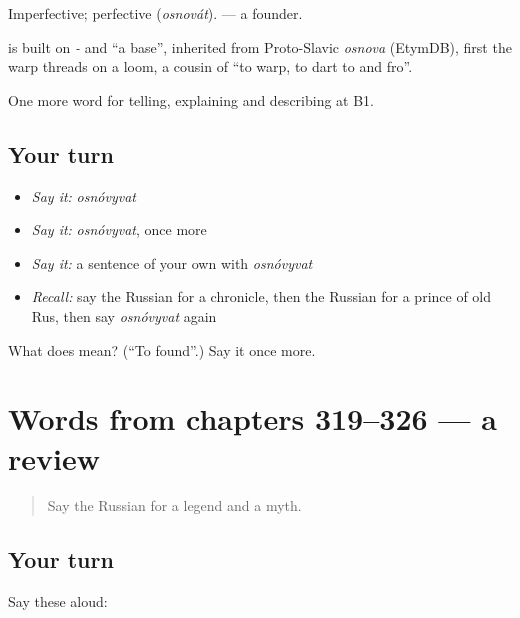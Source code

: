 Imperfective; perfective \emph{} (\emph{osnovát}). \emph{} — a founder.

\begin{cousinweb}
\emph{} is built on \emph{-} and \emph{} \textquotedblleft{}a base\textquotedblright{}, inherited from Proto-Slavic \emph{osnova} (EtymDB), first the warp threads on a loom, a cousin of \emph{} \textquotedblleft{}to warp, to dart to and fro\textquotedblright{}.
\end{cousinweb}

\begin{grammarlens}[title={What you've built}]
One more word for telling, explaining and describing at B1.
\end{grammarlens}

\subsection*{Your turn}
\begin{itemize}
\raggedright
  \item \emph{Say it:} \emph{osnóvyvat}
  \item \emph{Say it:} \emph{osnóvyvat}, once more
  \item \emph{Say it:} a sentence of your own with \emph{osnóvyvat}
  \item \emph{Recall:} say the Russian for a chronicle, then the Russian for a prince of old Rus, then say \emph{osnóvyvat} again
\end{itemize}

\begin{tcolorbox}[breakable,colback=teal!4,colframe=teal!35!black,title={Before you move on}]
What does  mean? (\textquotedblleft{}To found\textquotedblright{}.) Say it once more.
\end{tcolorbox}
\section[(dialogue)]{Words from chapters 319–326 — a review}

\label{lesson:RU-R326-review-319-326}



\begin{quote}
Say the Russian for a legend and a myth.
\end{quote}

\subsection*{Your turn}
Say these aloud:

